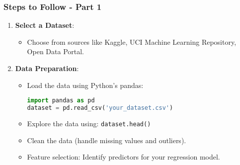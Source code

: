 \documentclass[aspectratio=169]{beamer}
\begin{document}
\begin{frame}[fragile]
    \frametitle{Steps to Follow - Part 1}

    \begin{enumerate}
        \item \textbf{Select a Dataset}:
            \begin{itemize}
                \item Choose from sources like Kaggle, UCI Machine Learning Repository, Open Data Portal.
            \end{itemize}
            
        \item \textbf{Data Preparation}:
            \begin{itemize}
                \item Load the data using Python's pandas:
                \begin{lstlisting}[language=Python]
import pandas as pd
dataset = pd.read_csv('your_dataset.csv')
                \end{lstlisting}
                
                \item Explore the data using:
                \lstinline!dataset.head()!
                \item Clean the data (handle missing values and outliers).
                \item Feature selection: Identify predictors for your regression model.
            \end{itemize}
    \end{enumerate}
\end{frame}
\end{document}
